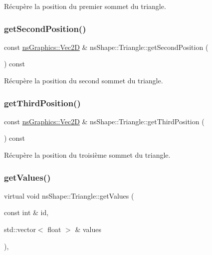 Récupère la position du premier sommet du triangle. 

\mbox{\label{classns_shape_1_1_triangle_a0222c889721e15942fde8719727da6ef}} 
\subsubsection{\texorpdfstring{get\+Second\+Position()}{getSecondPosition()}}
{\footnotesize\ttfamily const \hyperlink{classns_graphics_1_1_vec2_d}{ns\+Graphics\+::\+Vec2D} \& ns\+Shape\+::\+Triangle\+::get\+Second\+Position (\begin{DoxyParamCaption}{ }\end{DoxyParamCaption}) const}



Récupère la position du second sommet du triangle. 

\mbox{\label{classns_shape_1_1_triangle_a8ff04f062cf1dcb119f9e814ce8f943a}} 
\subsubsection{\texorpdfstring{get\+Third\+Position()}{getThirdPosition()}}
{\footnotesize\ttfamily const \hyperlink{classns_graphics_1_1_vec2_d}{ns\+Graphics\+::\+Vec2D} \& ns\+Shape\+::\+Triangle\+::get\+Third\+Position (\begin{DoxyParamCaption}{ }\end{DoxyParamCaption}) const}



Récupère la position du troisième sommet du triangle. 

\mbox{\label{classns_shape_1_1_triangle_a745ce53bf673b56a23a30f732a041834}} 
\subsubsection{\texorpdfstring{get\+Values()}{getValues()}}
{\footnotesize\ttfamily virtual void ns\+Shape\+::\+Triangle\+::get\+Values (\begin{DoxyParamCaption}\item[{const int \&}]{id,  }\item[{std\+::vector$<$ float $>$ \&}]{values }\end{DoxyParamCaption})\hspace{0.3cm}{\ttfamily [override]}, {\ttfamily [virtual]}}



